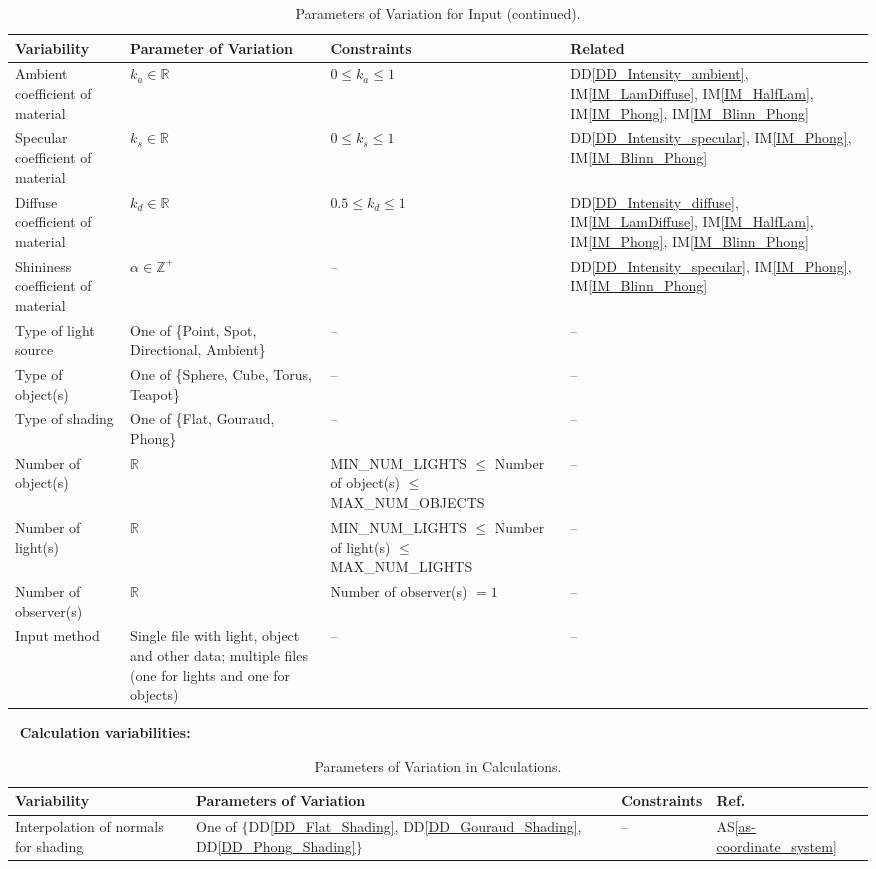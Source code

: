 \documentclass[12pt]{article}
\newcommand{\ddref}[1]{DD\ref{#1}}
\newcommand{\aSref}[1]{AS\ref{#1}}
\newcommand{\iref}[1]{IM\ref{#1}}
\begin{document}
\begin{table}[H]
	\centering
	\begin{tabular}{|p{3cm}|p{3cm}|p{5cm}|p{2cm}|}
		\hline
		\textbf{Variability} & \textbf{Parameter of Variation} & 
		\textbf{Constraints} &  \textbf{Related} \\
		\hline
		Ambient coefficient of material	& $k_{a} \in \mathbb{R}$ & $0 \le 
		k_{a} \le 1$ & \ddref{DD_Intensity_ambient}, \iref{IM_LamDiffuse}, 
		\iref{IM_HalfLam}, \iref{IM_Phong}, \iref{IM_Blinn_Phong}  \\
		\hline		
		Specular coefficient of material & $k_{s} \in \mathbb{R}$ & $0 \le 
		k_{s} \le 1$ & \ddref{DD_Intensity_specular}, \iref{IM_Phong}, 
		\iref{IM_Blinn_Phong} \\
		\hline
		Diffuse coefficient of material	& $k_{d} \in \mathbb{R}$ & $0.5 \le 
		k_{d} 
		\le 1$ & \ddref{DD_Intensity_diffuse}, \iref{IM_LamDiffuse}, 
		\iref{IM_HalfLam}, \iref{IM_Phong}, \iref{IM_Blinn_Phong}  \\
		\hline		
		Shininess coefficient of material	& $\alpha \in
		\mathbb{Z^{+}}$ & 
		-- & 
		\ddref{DD_Intensity_specular}, \iref{IM_Phong}, \iref{IM_Blinn_Phong} 
		\\
		\hline
		Type of light source & One of \{Point, Spot, Directional, Ambient\} & 
		-- 
		& --\\
		\hline
		Type of object(s) & One of \{Sphere, Cube, Torus, Teapot\} & -- & 
		--\\
		\hline
		Type of shading & One of \{Flat, Gouraud, Phong\} & -- & 
		--\\
		\hline
		Number of object(s) & $\mathbb{R}$ & MIN\_NUM\_LIGHTS $\le$ Number of 
		object(s) $\le$ MAX\_NUM\_OBJECTS & 
		--\\
		\hline
		Number of light(s) & $\mathbb{R}$ & MIN\_NUM\_LIGHTS $\le$ Number of 
		light(s) $\le$ MAX\_NUM\_LIGHTS & 
		--\\
		\hline
		Number of observer(s) & $\mathbb{R}$ & Number of observer(s) $= 
		1$  & 
		--\\
		\hline
		Input method & Single file with light, object and other data; multiple 
		files (one for lights and one for objects) & -- & 
		--\\
		\hline					
	\end{tabular}
	\caption{Parameters of Variation for Input (continued).}
	\label{tbl:Input_Variations_cont2}
\end{table}

~\newpage
\textbf{Calculation variabilities:}
\begin{table}[H]
	\centering
	\begin{tabular}{|p{5cm}|p{5cm}|p{2cm}|p{2cm}|}
		\hline
		\textbf{Variability} & \textbf{Parameters of Variation} & Constraints & 
		\textbf{Ref.}\\
		\hline
		Interpolation of normals for shading & One of 
		$\{$\ddref{DD_Flat_Shading}, \ddref{DD_Gouraud_Shading}, 
		\ddref{DD_Phong_Shading}$\}$ & -- & \aSref{as-coordinate_system} \\
		\hline		
	\end{tabular}
	\caption{Parameters of Variation in Calculations.}
\end{table}
\end{document}

